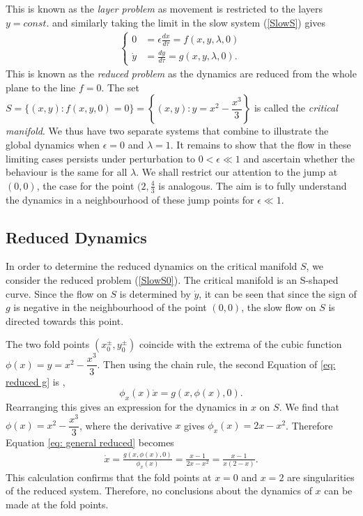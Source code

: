This is known as the \emph{layer problem} as movement is restricted to the layers $y=const.$ and similarly taking the limit in the slow system (\ref{SlowS}) gives
	\begin{align}\label{SlowS0}
		\begin{cases}
			0 &= \epsilon \frac{dx}{d \tau} = f(x,y,\lambda, 0)\\
			\dot{y} & = \frac{dy}{d \tau} =  g( x,y, \lambda,0).
		\end{cases}
	\end{align}
This is known as the \emph{reduced problem} as the dynamics are reduced from the whole plane to the line $f=0$. The set $S= \{ (x,y) : f(x,y,0)=0 \} = \left\{ (x,y) : y = x^2-\dfrac{x^3}{3}\right \}$ is called the \emph{critical manifold}. We thus have two separate systems that combine to illustrate the global dynamics when $\epsilon =0$ and $\lambda = 1$. It remains to show that the flow in these limiting cases persists under perturbation to $0<\epsilon \ll 1$ and ascertain whether the behaviour is the same for all $\lambda$. We shall restrict our attention to the jump at $(0,0)$, the case for the point $(2,\frac{4}{3}$ is analogous. The aim is to fully understand the dynamics in a neighbourhood of these jump points for $\epsilon \ll 1$.

\subsection{Reduced Dynamics}
In order to determine the reduced dynamics on the critical manifold $S$, we consider the reduced problem (\ref{SlowS0}). The critical manifold is  an S-shaped curve. Since the flow on $S$ is determined by $\dot{y}$, it can be seen that since the sign of $g$ is negative in the neighbourhood of the point $(0,0)$, the slow flow on $S$ is directed towards this point.

The two  fold points $(x_0^\pm,y_0^\pm)$ coincide with the extrema of the cubic function  $ \phi(x) = y = x^2-\dfrac{x^3}{3}$.
Then using the chain rule, the second Equation of \ref{eq: reduced g} is  \citep{krupa2001},
\begin{equation}
\phi_x(x)\dot{x}=g(x,\phi(x),0).
\label{eq: general reduced}
\end{equation}
Rearranging this gives an expression for the dynamics in $x$ on $S$.
We find that $\phi(x)=x^2-\dfrac{x^3}{3}$, where the derivative \wrt $x$ gives $\phi_x(x)=2x-x^2$.
Therefore Equation \ref{eq: general reduced} becomes 
\begin{align*}
\dot{x} = \frac{g(x,\phi(x),0)}{ \phi_x(x)} = \frac{ x-1}{2x-x^2} =\frac{ x-1}{x(2-x)}.
\end{align*}
This calculation confirms that the fold points at $x=0$ and $x=2$ are singularities of the reduced system. Therefore, no conclusions about the dynamics of $x$ can be made at the fold points. 


